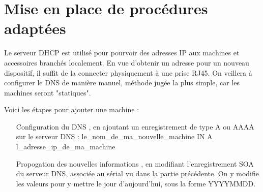 \section{Mise en place de procédures adaptées}

Le serveur DHCP est utilisé pour pourvoir des adresses IP aux machines et 
accessoires branchés localement. En vue d'obtenir un adresse pour un 
nouveau dispositif, il suffit de la connecter physiquement à une prise RJ45.
On veillera à configurer le DNS de manière manuel, méthode jugée la plus simple,
car les machines seront "statiques".

Voici les étapes pour ajouter une machine :
\begin{itemize}
\item[Configuration du DNS], en ajoutant un enregistrement de type A ou AAAA
sur le serveur DNS :
le_nom_de_ma_nouvelle_machine IN A l_adresse_ip_de_ma_machine
\item[Propogation des nouvelles informations], en modifiant l'enregistrement SOA
du serveur DNS, associée au sérial vu dans la partie précédente. On y modifie les
valeurs pour y mettre le jour d'aujourd'hui, sous la forme YYYYMMDD.
\end{itemize}
